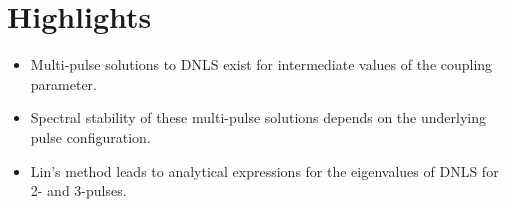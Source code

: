 \documentclass[12pt]{article}
\begin{document}
\section*{Highlights}

\begin{itemize}
    \item Multi-pulse solutions to DNLS exist for intermediate values of the coupling parameter.
    \item Spectral stability of these multi-pulse solutions depends on the underlying pulse configuration.
    \item Lin's method leads to analytical expressions for the eigenvalues of DNLS for 2- and 3-pulses.
\end{itemize}
\end{document}
